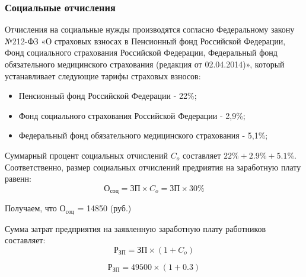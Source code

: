 \documentclass[a4paper]{extarticle}
\begin{document}
\subsubsection{Социальные отчисления}
Отчисления на социальные нужды производятся согласно Федеральному закону №212-ФЗ «О страховых взносах в Пенсионный фонд Российской Федерации, Фонд социального страхования Российской Федерации, Федеральный фонд обязательного медицинского страхования (редакция от 02.04.2014)», который устанавливает следующие тарифы страховых взносов:
\begin{itemize}
  \item Пенсионный фонд Российской Федерации - 22\%;
  \item Фонд социального страхования Российской Федерации - 2,9\%;
  \item Федеральный фонд обязательного медицинского страхования - 5,1\%;
\end{itemize}\par
Суммарный процент социальных отчислений $C_o$ составляет $22\% + 2.9\% + 5.1\%$. Соответственно, размер социальных отчислений предриятия на заработную плату равенн:
\begin{equation}
\label{form3}
	\text{О}_\text{соц} = \text{ЗП}\times C_o = \text{ЗП}\times 30\%
\end{equation}\par
Получаем, что $\text{О}_\text{соц}$ = 14850 (руб.)\par
Сумма затрат предприятия на заявленную заработную плату работников составляет:
\begin{equation}
\label{form4}
	\text{Р}_\text{ЗП}=\text{ЗП}\times(1+C_o)
\end{equation}

\begin{equation}
\label{form5}
	\text{Р}_\text{ЗП}=49500\times(1+0.3)
\end{equation}\par
\end{document}
